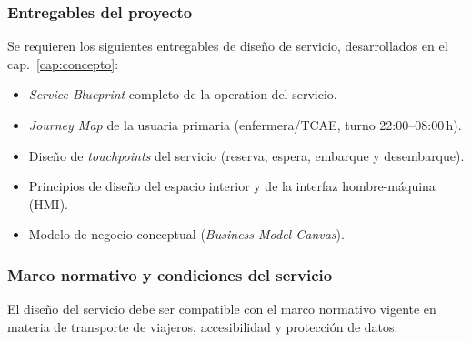 
\subsubsection{Entregables del proyecto}
\label{sec:pliego-entregables}

Se requieren los siguientes entregables de diseño de servicio,
desarrollados en el cap.~\ref{cap:concepto}:

\begin{itemize}
  \item \emph{Service Blueprint} completo de la operation del servicio.
  \item \emph{Journey Map} de la usuaria primaria (enfermera/\acs{TCAE},
        turno 22:00--08:00\,h).
  \item Diseño de \emph{touchpoints} del servicio (reserva, espera,
        embarque y desembarque).
  \item Principios de diseño del espacio interior y de la interfaz
        hombre-máquina (\acs{HMI}).
  \item Modelo de negocio conceptual (\emph{Business Model Canvas}).
\end{itemize}


\subsubsection{Marco normativo y condiciones del servicio}
\label{sec:pliego-normativa}

El diseño del servicio debe ser compatible con el marco normativo
vigente en materia de transporte de viajeros, accesibilidad y
protección de datos:

